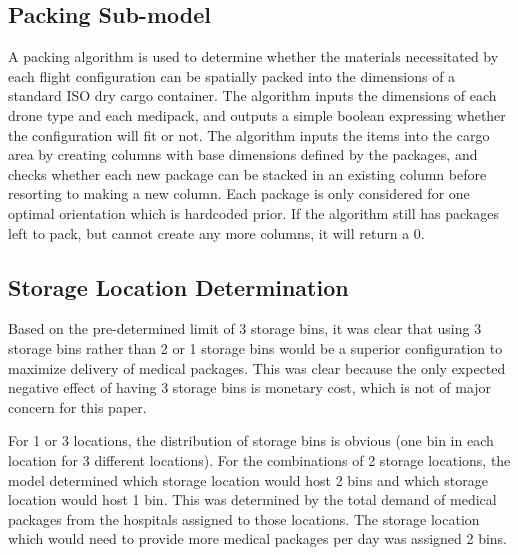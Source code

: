 \documentclass[twocolumn,10pt]{asme2ej}
\begin{document}
\subsection{Packing Sub-model}
A packing algorithm is used to determine whether the materials necessitated by each flight configuration can be spatially packed into the dimensions of a standard ISO dry cargo container. The algorithm inputs the dimensions of each drone type and each medipack, and outputs a simple boolean expressing whether the configuration will fit or not. The algorithm  inputs the items into the cargo area by creating columns with base dimensions defined by the packages, and checks whether each new package can be stacked in an existing column before resorting to making a new column. Each package is only considered for one optimal orientation which is hardcoded prior. If the algorithm still has packages left to pack, but cannot create any more columns, it will return a 0.

\subsection{Storage Location Determination}
Based on the pre-determined limit of 3 storage bins, it was clear that using 3 storage bins rather than 2 or 1 storage bins would be a superior configuration to maximize delivery of medical packages. This was clear because the only expected negative effect of having 3 storage bins is monetary cost, which is not of major concern for this paper. 

For 1 or 3 locations, the distribution of storage bins is obvious (one bin in each location for 3 different locations). For the combinations of 2 storage locations, the model determined which storage location would host 2 bins and which storage location would host 1 bin. This was determined by the total demand of medical packages from the hospitals assigned to those locations. The storage location which would need to provide more medical packages per day was assigned 2 bins. 
\end{document}
